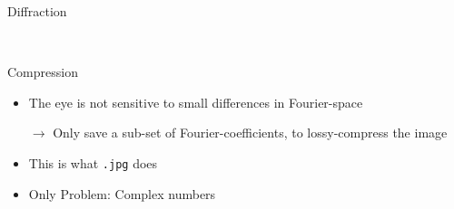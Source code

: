 \begin{frame}{Diffraction}
    \centering
    {\color{mLightBrown}\rightarrow}\

    {\color{mLightBrown}\rightarrow}\
\end{frame}
\begin{frame}{Compression}
    \begin{itemize}
        \item The eye is not sensitive to small differences in Fourier-space
        \item[$\rightarrow$] Only save a sub-set of Fourier-coefficients, to lossy-compress the image
        \item This is what \texttt{.jpg} does
        \item Only Problem: Complex numbers
    \end{itemize}

\end{frame}

